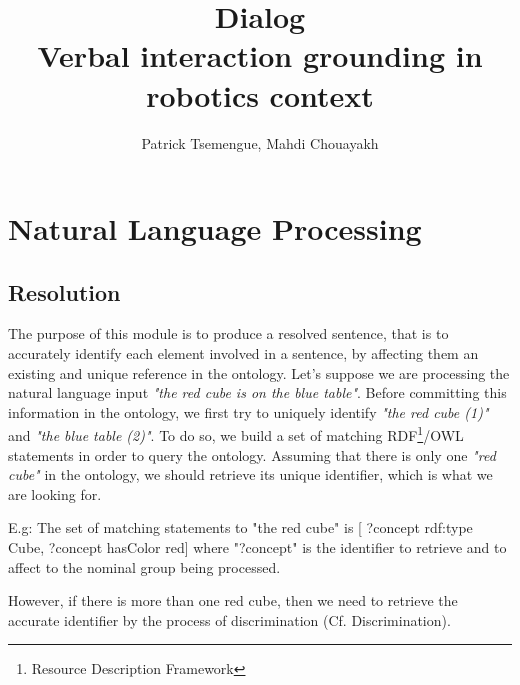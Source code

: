 \documentclass[twoside,a4paper,10pt]{report}
\title{ {\sc Dialog}\\ Verbal interaction grounding in robotics context}
\author{Patrick Tsemengue, Mahdi Chouayakh}
\newcommand{\dokutitlelevelone}[1]{\chapter{#1}}
\newcommand{\dokutitleleveltwo}[1]{\section{#1}}
\newcommand{\dokufootnote}[1]{\footnote{#1}}
\newcommand{\dokuitalic}[1]{\textsl{#1}}
\begin{document}
\thispagestyle{empty}
\maketitle
\thispagestyle{empty}
\cleardoublepage
\tableofcontents
\newpage
\thispagestyle{plain}
\cleardoublepage
\newpage





\dokutitlelevelone{Natural Language Processing}
\label{8f1c1b9cb9fb5e1df55908ebb8f63a48}%
\label{f0e926ab940662bebfe368ba24960a2d}%

\dokutitleleveltwo{Resolution}
\label{b7e164b34ff76b1cda93a058604190da}%

The purpose of this module is to produce a resolved sentence, that is to accurately identify each element involved in a sentence, by affecting them an existing and unique reference in the ontology.
Let's suppose we are processing the natural language input \dokuitalic{"the red cube is on the blue table"}. Before committing this information in the ontology, we first try to uniquely identify \dokuitalic{"the red cube (1)"} and \dokuitalic{"the blue table (2)"}.
To do so, we build a set of matching RDF\dokufootnote{Resource Description Framework}/OWL statements in order to query the ontology. 
Assuming that there is only one \dokuitalic{"red cube"} in the ontology, we should retrieve its unique identifier, which is what we are looking for.



\small
\begin{verbatimtab}
  E.g:
  The set of matching statements to "the red cube" is 
  [ ?concept rdf:type Cube, ?concept hasColor red]
  where "?concept" is the identifier to retrieve and to affect to the nominal group being processed.
  
\end{verbatimtab}
\normalsize

However, if there is more than one red cube, then we need to retrieve the accurate identifier by the process of discrimination (Cf. Discrimination).
\end{document}
